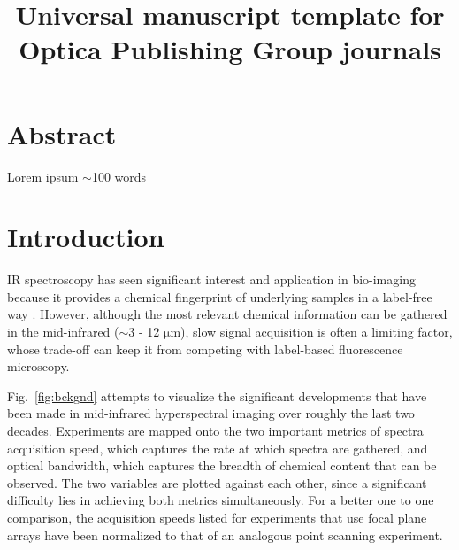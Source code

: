 \documentclass{optica-article}
\begin{document}
\title{Universal manuscript template for Optica Publishing Group journals}

\section{Abstract}
Lorem ipsum $\sim$100 words

\section{Introduction}
IR spectroscopy has seen significant interest and application in bio-imaging because it provides a chemical fingerprint of underlying samples in a label-free way \cite{bakerUsingFourierTransform2014}. However, although the most relevant chemical information can be gathered in the mid-infrared ($\sim$3 - 12 $\mathrm{\mu m}$), slow signal acquisition is often a limiting factor, whose trade-off can keep it from competing with label-based fluorescence microscopy.

\mbox{Fig. \ref{fig:bckgnd}} attempts to visualize the significant developments that have been made in mid-infrared hyperspectral imaging over roughly the last two decades. Experiments are mapped onto the two important metrics of spectra acquisition speed, which captures the rate at which spectra are gathered, and optical bandwidth, which captures the breadth of chemical content that can be observed. The two variables are plotted against each other, since a significant difficulty lies in achieving both metrics simultaneously. For a better one to one comparison, the acquisition speeds listed for experiments that use focal plane arrays have been normalized to that of an analogous point scanning experiment.

\end{document}
